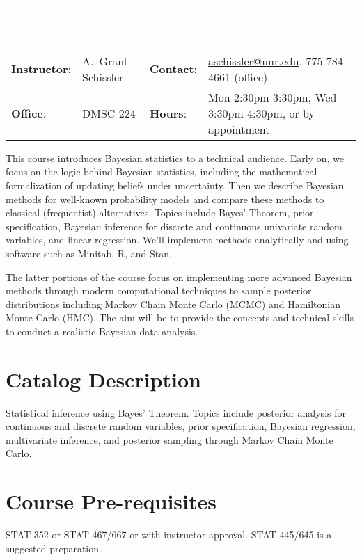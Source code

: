 \documentclass[11pt,onecolumn]{article}
\title{\textbf{\coursename}}
\author{{\semester}---{\roomnumb}---{\classtimes}}
\date{}
\makeatletter
\newcommand{\myname}{A.~Grant Schissler}
\newcommand{\myemail}{aschissler@unr.edu}
\newcommand{\office}{DMSC 224}
\newcommand{\officehours}{Mon 2:30pm-3:30pm, Wed 3:30pm-4:30pm, or by appointment}
\makeatother
\begin{document}
\maketitle

\vspace{-0.25in}
\noindent\makebox[\linewidth]{\rule{\textwidth}{1pt}}

\begin{center}
\begin{tabular}{llll}
\textbf{Instructor}:&\myname & \textbf{Contact}:&\href{mailto:\myemail}{\myemail}, 775-784-4661 (office)\\
\textbf{Office}:&\office & \textbf{Hours}:&\officehours\\
\end{tabular}
\end{center}

This course introduces Bayesian statistics to a technical audience. Early on, we focus on the logic behind Bayesian statistics, including the mathematical formalization of updating beliefs under uncertainty. Then we describe Bayesian methods for well-known probability models and compare these methods to classical (frequentist) alternatives. Topics include Bayes' Theorem, prior specification, Bayesian inference for discrete and continuous univariate random variables, and linear regression. We'll implement methods analytically and using software such as Minitab, R, and Stan.

The latter portions of the course focus on implementing more advanced Bayesian methods through modern computational techniques to sample posterior distributions including Markov Chain Monte Carlo (MCMC) and Hamiltonian Monte Carlo (HMC). The aim will be to provide the concepts and technical skills to conduct a realistic Bayesian data analysis. 

\section*{Catalog Description}
Statistical inference using Bayes' Theorem. Topics include posterior analysis for continuous and discrete random variables, prior specification, Bayesian regression, multivariate inference, and posterior sampling through Markov Chain Monte Carlo.

\section*{Course Pre-requisites}
STAT 352 or STAT 467/667 or with instructor approval. STAT 445/645 is a suggested preparation.
\end{document}
